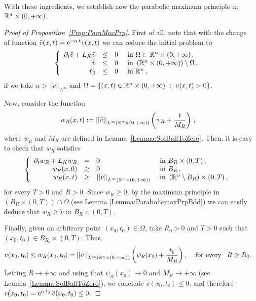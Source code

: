 With these ingredients, we establish now the parabolic maximum principle in $\mathbb{R}^n \times (0,+\infty)$. 

\begin{proof}[Proof of Proposition~\ref{Prop:ParaMaxPrp}]
First of all, note that with the change of function $\tilde{v}(x,t) = \mathrm{e}^{-\alpha\,t} v(x,t)$ we can reduce the initial problem to
\begin{equation*}
\left\{\begin{array}{rcll}
\partial_t \tilde{v} + L_K  \tilde{v} &\leq& 0 & \textrm{ in } \Omega \subset\mathbb{R}^n\times(0,+\infty)\,,\\
\tilde{v} &\leq& 0 & \textrm{ in }  \left(\mathbb{R}^n\times(0,+\infty)\right) \setminus  \Omega\,,\\
\tilde{v}_0 &\leq& 0 & \textrm{ in } \mathbb{R}^n\,,
\end{array} \right.
\end{equation*}
if we take $\alpha > ||c||_{L^\infty}$ and $\Omega = \{(x,t)\in \mathbb{R}^n\times(0,+\infty) \ : \ v(x,t) > 0\}$.

Now, consider the function 
$$ 
w_R(x,t) := \left | \left |{\tilde{v} } \right | \right |_{L^\infty(\mathbb{R}^n \times (0,+\infty))} \left( \psi_R + \dfrac{t}{M_R} \right)\,,
$$
where $\psi_R$ and $M_R$ are defined in Lemma~\ref{Lemma:SolBallToZero}. Then, it is easy to check that $w_R$ satisfies
\begin{equation*}
\left\{\begin{array}{rcll}
\partial_t w_R + L_K  w_R &=& 0 & \textrm{ in }B_R\times(0,T)\,,\\
w_R(x,0) &\geq& 0 & \textrm{ in } B_R\,,\\
w_R(x,t) &\geq& \left | \left |{\tilde{v}} \right | \right |_{L^\infty(\mathbb{R}^n \times (0,+\infty))}  & \textrm{ in } \left( \mathbb{R}^n\setminus B_R\right) \times (0,T) \,,
\end{array} \right.
\end{equation*}
for every $T>0$ and $R>0$. Since $w_R \geq 0$, by the maximum principle in $(B_R\times (0,T))\cap \Omega$ (see Lemma \ref{Lemma:ParabolicmaxPrpBdd}) we can easily deduce that $ w_R\geq \tilde{v} $ in $B_R\times(0,T)$.

Finally, given an arbitrary point $(x_0,t_0) \in \Omega$, take $R_0>0$ and $T>0$ such that $(x_0,t_0)\in B_{R_0}\times (0,T)$. Thus,
$$ 
\tilde{v}(x_0,t_0) \leq w_R(x_0,t_0) =  \left | \left |{\tilde{v} } \right | \right |_{L^\infty(\mathbb{R}^n \times (0,+\infty))} \left( \psi_R (x_0) + \dfrac{t_0}{M_R} \right), \,\,\,\,\,\text{ for every }\,\,\, R\geq R_0.
$$
Letting $R \to +\infty$ and using that $\psi_R(x_0) \to 0$ and $M_R \to +\infty$ (see Lemma~\ref{Lemma:SolBallToZero}), we conclude $ \tilde{v}(x_0,t_0) \leq  0$, and therefore $ v(x_0,t_0) = \mathrm{e}^{\alpha\,t_0}\,\tilde{v}(x_0,t_0) \leq 0$.
\end{proof}

